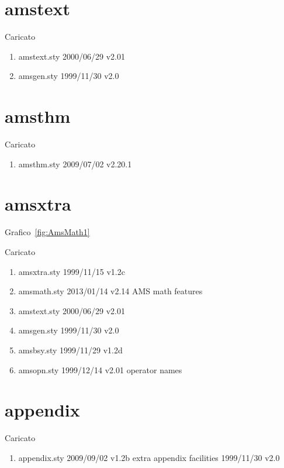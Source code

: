 \section{amstext}

Caricato 
\begin{enumerate}
\item amstext.sty 2000/06/29 v2.01
\item amsgen.sty 1999/11/30 v2.0
\end{enumerate}
\section{amsthm}

Caricato 
\begin{enumerate}
\item amsthm.sty 2009/07/02 v2.20.1
\end{enumerate}
\section{amsxtra}

Grafico~\vref{fig:AmsMath1}

Caricato 
\begin{enumerate}
\item amsxtra.sty 1999/11/15 v1.2c
\item amsmath.sty 2013/01/14 v2.14 AMS math features
\item amstext.sty 2000/06/29 v2.01
\item amsgen.sty 1999/11/30 v2.0
\item amsbsy.sty 1999/11/29 v1.2d
\item amsopn.sty 1999/12/14 v2.01 operator names
\end{enumerate}
\section{appendix}

Caricato 
\begin{enumerate}
\item appendix.sty 2009/09/02 v1.2b extra appendix facilities 1999/11/30 v2.0
\end{enumerate}
